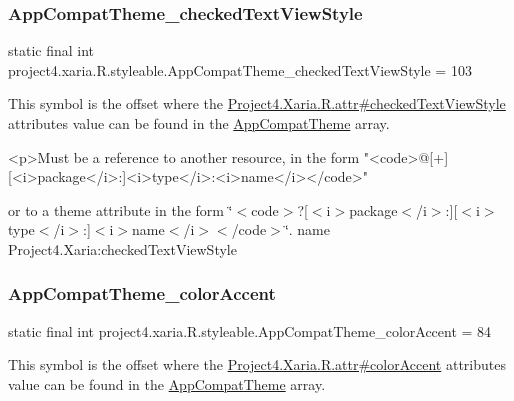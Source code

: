 \subsubsection{\texorpdfstring{App\+Compat\+Theme\+\_\+checked\+Text\+View\+Style}{AppCompatTheme\_checkedTextViewStyle}}
{\footnotesize\ttfamily static final int project4.\+xaria.\+R.\+styleable.\+App\+Compat\+Theme\+\_\+checked\+Text\+View\+Style = 103\hspace{0.3cm}{\ttfamily [static]}}

This symbol is the offset where the \hyperlink{}{Project4.\+Xaria.\+R.\+attr\#checked\+Text\+View\+Style} attribute\textquotesingle{}s value can be found in the \hyperlink{classproject4_1_1xaria_1_1R_1_1styleable_aad8bec413e2350f9404e6ff0e831a85d}{App\+Compat\+Theme} array.

\begin{DoxyVerb}      <p>Must be a reference to another resource, in the form "<code>@[+][<i>package</i>:]<i>type</i>:<i>name</i></code>"
\end{DoxyVerb}
 or to a theme attribute in the form \char`\"{}$<$code$>$?\mbox{[}$<$i$>$package$<$/i$>$\+:\mbox{]}\mbox{[}$<$i$>$type$<$/i$>$\+:\mbox{]}$<$i$>$name$<$/i$>$$<$/code$>$\char`\"{}.  name Project4.\+Xaria\+:checked\+Text\+View\+Style \mbox{\label{classproject4_1_1xaria_1_1R_1_1styleable_a6e46aba539289d70ed3d16e8e7bcb018}} 
\subsubsection{\texorpdfstring{App\+Compat\+Theme\+\_\+color\+Accent}{AppCompatTheme\_colorAccent}}
{\footnotesize\ttfamily static final int project4.\+xaria.\+R.\+styleable.\+App\+Compat\+Theme\+\_\+color\+Accent = 84\hspace{0.3cm}{\ttfamily [static]}}

This symbol is the offset where the \hyperlink{}{Project4.\+Xaria.\+R.\+attr\#color\+Accent} attribute\textquotesingle{}s value can be found in the \hyperlink{classproject4_1_1xaria_1_1R_1_1styleable_aad8bec413e2350f9404e6ff0e831a85d}{App\+Compat\+Theme} array.

